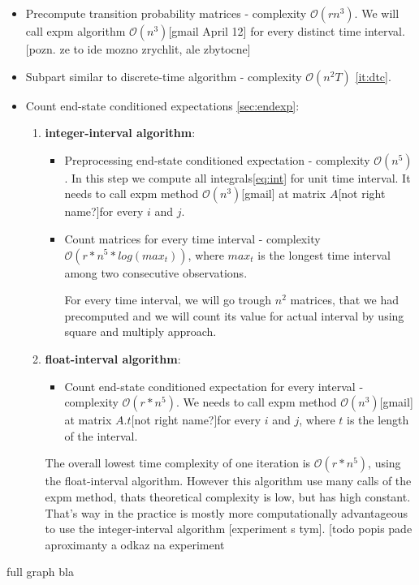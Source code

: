 \documentclass[thesis=M,english]{FITthesis}[2012/10/20]
\begin{document}
\begin{itemize}
\begin{itemize}\label{it:ctc}
\item Precompute transition probability matrices - complexity $\mathcal{O}(rn^3)$. We will call expm algorithm $\mathcal{O}(n^3)$[gmail April 12] for every distinct time interval. [pozn. ze to ide mozno zrychlit, ale zbytocne]
\item Subpart similar to discrete-time algorithm - complexity $\mathcal{O}(n^2T)$ \ref{it:dtc}.
\item 

Count end-state conditioned expectations \ref{sec:endexp}:
\begin{enumerate}[resume]
\setcounter{enumi}{0}
\item \textbf{integer-interval algorithm}:

\begin{itemize}
\item Preprocessing end-state conditioned expectation - complexity $\mathcal{O}(n^5)$. 
    In this step we compute all integrals\eqref{eq:int} for unit time interval. It needs to call expm method $\mathcal{O}(n^3)$[gmail] at matrix $A$[not right name?]for every $i$ and $j$.   
\item Count matrices for every time interval - complexity $\mathcal{O}(r*n^5*log(max_t))$, where $max_t$ is the longest time interval among two consecutive observations.

For every time interval, we will go trough $n^2$ matrices, that we had precomputed and we will count its value for actual interval by using square and multiply approach. 


\end{itemize}

\item \textbf{float-interval algorithm}: 
\begin{itemize}
\item Count end-state conditioned expectation for every interval - complexity $\mathcal{O}(r*n^5)$. 
We needs to call expm method $\mathcal{O}(n^3)$[gmail] at matrix $A.t$[not right name?]for every $i$ and $j$, where $t$ is the length of the interval.
\end{itemize}

The overall lowest time complexity of one iteration is $\mathcal{O}(r*n^5)$, using the float-interval algorithm. However this algorithm use many calls of the expm method, thats theoretical complexity is low, but has high constant. That's way in the practice is mostly more computationally advantageous to use the integer-interval algorithm [experiment s tym]. [todo popis pade aproximanty a odkaz na experiment
\end{enumerate}
 

\end{itemize}   

full graph bla

\end{itemize}
\end{document}
